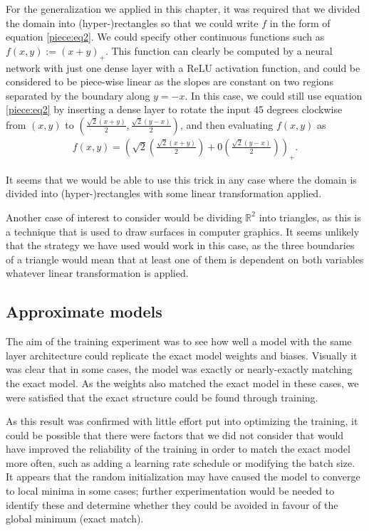 \documentclass{somasmsc}
\begin{document}
For the generalization we applied in this chapter, it was required that we divided the domain into (hyper-)rectangles so that we could write $f$ in the form of equation \ref{piece:eq2}. We could specify other continuous functions such as $f\left(x, y\right) := \left(x + y\right)_+$. This function can clearly be computed by a neural network with just one dense layer with a ReLU activation function, and could be considered to be piece-wise linear as the slopes are constant on two regions separated by the boundary along $y = -x$. In this case, we could still use equation \ref{piece:eq2} by inserting a dense layer to rotate the input 45 degrees clockwise from $\left(x, y\right)$ to $\left(\frac{\sqrt{2}\left(x+y\right)}{2}, \frac{\sqrt{2}\left(y-x\right)}{2}\right)$, and then evaluating $f\left(x,y\right)$ as
\begin{align*}
    f\left(x,y\right) = \left(\sqrt{2}\left(\frac{\sqrt{2}\left(x+y\right)}{2}\right) + 0 \left(\frac{\sqrt{2}\left(y-x\right)}{2}\right)\right)_+.
\end{align*}

It seems that we would be able to use this trick in any case where the domain is divided into (hyper-)rectangles with some linear transformation applied.

Another case of interest to consider would be dividing $\mathbb{R}^2$ into triangles, as this is a technique that is used to draw surfaces in computer graphics. It seems unlikely that the strategy we have used would work in this case, as the three boundaries of a triangle would mean that at least one of them is dependent on both variables whatever linear transformation is applied.

\subsection{Approximate models}

The aim of the training experiment was to see how well a model with the same layer architecture could replicate the exact model weights and biases. Visually it was clear that in some cases, the model was exactly or nearly-exactly matching the exact model. As the weights also matched the exact model in these cases, we were satisfied that the exact structure could be found through training.

As this result was confirmed with little effort put into optimizing the training, it could be possible that there were factors that we did not consider that would have improved the reliability of the training in order to match the exact model more often, such as adding a learning rate schedule or modifying the batch size. It appears that the random initialization may have caused the model to converge to local minima in some cases; further experimentation would be needed to identify these and determine whether they could be avoided in favour of the global minimum (exact match).
\end{document}
